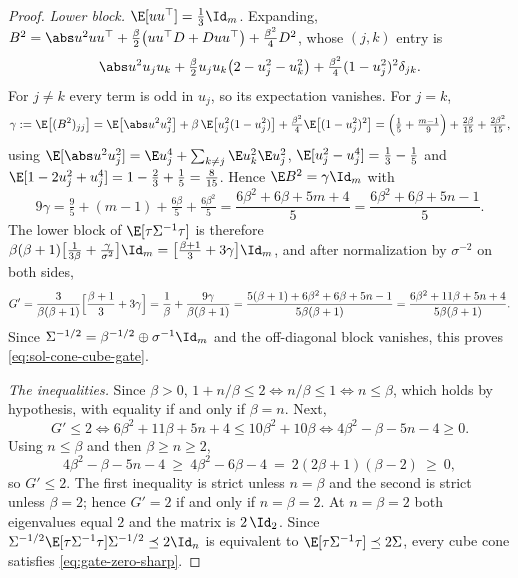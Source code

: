 \documentclass[../main.tex]{subfiles}
\begin{document}
\begin{proof}
\emph{Lower block.}
$\E[uu^\top]=\tfrac13\Id_m$.  Expanding,
$B^2=\abs u^2uu^\top+\tfrac\beta2\bigl(uu^\top D+Duu^\top\bigr)+\tfrac{\beta^2}4D^2$, whose
$(j,k)$ entry is
\[
  \abs u^2u_ju_k+\tfrac\beta2u_ju_k\bigl(2-u_j^2-u_k^2\bigr)+\tfrac{\beta^2}4(1-u_j^2)^2\delta_{jk}.
\]
For $j\ne k$ every term is odd in $u_j$, so its expectation vanishes.  For $j=k$,
\[
  \gamma:=\E\bigl[(B^2)_{jj}\bigr]
  =\E\bigl[\abs u^2u_j^2\bigr]+\beta\,\E\bigl[u_j^2(1-u_j^2)\bigr]+\tfrac{\beta^2}4\E\bigl[(1-u_j^2)^2\bigr]
  =\Bigl(\tfrac15+\tfrac{m-1}9\Bigr)+\tfrac{2\beta}{15}+\tfrac{2\beta^2}{15},
\]
using $\E[\abs u^2u_j^2]=\E u_j^4+\sum_{k\ne j}\E u_k^2\E u_j^2$, $\E[u_j^2-u_j^4]=\tfrac13-\tfrac15$
and $\E[1-2u_j^2+u_j^4]=1-\tfrac23+\tfrac15=\tfrac8{15}$.  Hence $\E B^2=\gamma\Id_m$ with
\[
  9\gamma=\tfrac95+(m-1)+\tfrac{6\beta}5+\tfrac{6\beta^2}5
  =\frac{6\beta^2+6\beta+5m+4}5=\frac{6\beta^2+6\beta+5n-1}5 .
\]
The lower block of $\E[\tau\Sigma^{-1}\tau]$ is therefore
$\beta(\beta+1)\bigl[\tfrac1{3\beta}+\tfrac{\gamma}{\sigma^2}\bigr]\Id_m
=\bigl[\tfrac{\beta+1}3+3\gamma\bigr]\Id_m$, and after normalization by $\sigma^{-2}$ on both
sides,
\[
  G'=\frac3{\beta(\beta+1)}\Bigl[\frac{\beta+1}3+3\gamma\Bigr]
  =\frac1\beta+\frac{9\gamma}{\beta(\beta+1)}
  =\frac{5(\beta+1)+6\beta^2+6\beta+5n-1}{5\beta(\beta+1)}
  =\frac{6\beta^2+11\beta+5n+4}{5\beta(\beta+1)} .
\]
Since $\Sigma^{-1/2}=\beta^{-1/2}\oplus\sigma^{-1}\Id_m$ and the off-diagonal block vanishes,
this proves \eqref{eq:sol-cone-cube-gate}.

\emph{The inequalities.}
Since $\beta>0$, $1+n/\beta\le2\iff n/\beta\le1\iff n\le\beta$, which holds by hypothesis,
with equality if and only if $\beta=n$.  Next,
\[
  G'\le2
  \iff 6\beta^2+11\beta+5n+4\le10\beta^2+10\beta
  \iff 4\beta^2-\beta-5n-4\ge0 .
\]
Using $n\le\beta$ and then $\beta\ge n\ge2$,
\[
  4\beta^2-\beta-5n-4\ \ge\ 4\beta^2-6\beta-4\ =\ 2(2\beta+1)(\beta-2)\ \ge\ 0,
\]
so $G'\le2$.  The first inequality is strict unless $n=\beta$ and the second is strict
unless $\beta=2$; hence $G'=2$ if and only if $n=\beta=2$.  At $n=\beta=2$ both eigenvalues
equal $2$ and the matrix is $2\,\Id_2$.  Since $\Sigma^{-1/2}\E[\tau\Sigma^{-1}\tau]\Sigma^{-1/2}\preceq2\Id_n$
is equivalent to $\E[\tau\Sigma^{-1}\tau]\preceq2\Sigma$, every cube cone satisfies
\eqref{eq:gate-zero-sharp}.


\end{proof}
\end{document}
